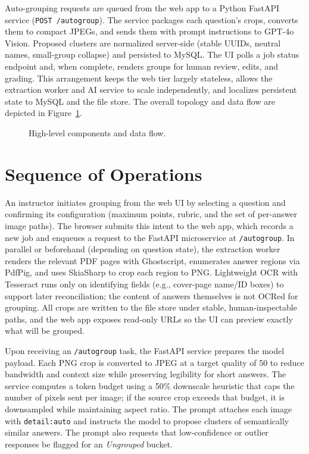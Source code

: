 \documentclass[ms,twoside,print]{nuthesis}
\begin{document}
Auto-grouping requests are queued from the web app to a Python FastAPI service (\texttt{POST /autogroup}). The service packages each question’s crops, converts them to compact JPEGs, and sends them with prompt instructions to GPT-4o Vision. Proposed clusters are normalized server-side (stable UUIDs, neutral names, small-group collapse) and persisted to MySQL. The UI polls a job status endpoint and, when complete, renders groups for human review, edits, and grading. This arrangement keeps the web tier largely stateless, allows the extraction worker and AI service to scale independently, and localizes persistent state to MySQL and the file store. The overall topology and data flow are depicted in Figure~\ref{fig:architecture}.

\begin{figure}[htb]
  \centering
  \resizebox{\textwidth}{!}{}
  \caption{High-level components and data flow.}
  \label{fig:architecture}
\end{figure}

\section{Sequence of Operations}
An instructor initiates grouping from the web UI by selecting a question and confirming its configuration (maximum points, rubric, and the set of per-answer image paths). The browser submits this intent to the web app, which records a new job and enqueues a request to the FastAPI microservice at \texttt{/autogroup}. In parallel or beforehand (depending on question state), the extraction worker renders the relevant PDF pages with Ghostscript, enumerates answer regions via PdfPig, and uses SkiaSharp to crop each region to PNG. Lightweight OCR with Tesseract runs only on identifying fields (e.g., cover-page name/ID boxes) to support later reconciliation; the content of answers themselves is not OCRed for grouping. All crops are written to the file store under stable, human-inspectable paths, and the web app exposes read-only URLs so the UI can preview exactly what will be grouped.

Upon receiving an \texttt{/autogroup} task, the FastAPI service prepares the model payload. Each PNG crop is converted to JPEG at a target quality of 50 to reduce bandwidth and context size while preserving legibility for short answers. The service computes a token budget using a 50\% downscale heuristic that caps the number of pixels sent per image; if the source crop exceeds that budget, it is downsampled while maintaining aspect ratio. The prompt attaches each image with \texttt{detail:auto} and instructs the model to propose clusters of semantically similar answers. The prompt also requests that low-confidence or outlier responses be flagged for an \emph{Ungrouped} bucket.
\end{document}
